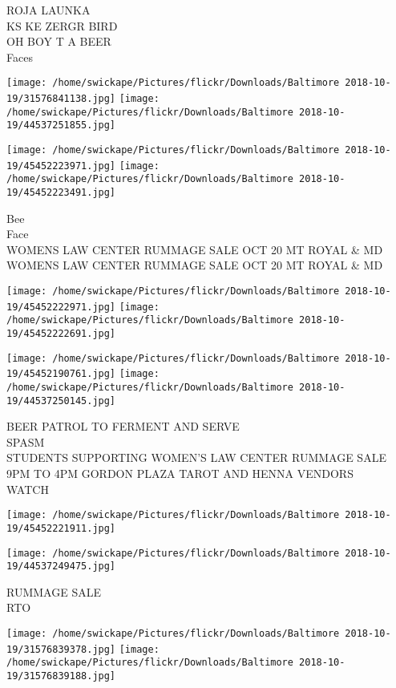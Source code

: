 \documentclass[10pt,letterpaper]{article}
\begin{document}
ROJA LAUNKA\\
KS KE ZERGR BIRD\\
OH BOY T A BEER\\
Faces
\pagebreak

\texttt{[image: /home/swickape/Pictures/flickr/Downloads/Baltimore 2018-10-19/31576841138.jpg]}
\texttt{[image: /home/swickape/Pictures/flickr/Downloads/Baltimore 2018-10-19/44537251855.jpg]}

\texttt{[image: /home/swickape/Pictures/flickr/Downloads/Baltimore 2018-10-19/45452223971.jpg]}
\texttt{[image: /home/swickape/Pictures/flickr/Downloads/Baltimore 2018-10-19/45452223491.jpg]}

Bee\\
Face\\
WOMENS LAW CENTER RUMMAGE SALE OCT 20 MT ROYAL \& MD\\
WOMENS LAW CENTER RUMMAGE SALE OCT 20 MT ROYAL \& MD
\pagebreak

\texttt{[image: /home/swickape/Pictures/flickr/Downloads/Baltimore 2018-10-19/45452222971.jpg]}
\texttt{[image: /home/swickape/Pictures/flickr/Downloads/Baltimore 2018-10-19/45452222691.jpg]}

\texttt{[image: /home/swickape/Pictures/flickr/Downloads/Baltimore 2018-10-19/45452190761.jpg]}
\texttt{[image: /home/swickape/Pictures/flickr/Downloads/Baltimore 2018-10-19/44537250145.jpg]}

BEER PATROL TO FERMENT AND SERVE\\
SPASM\\
STUDENTS SUPPORTING WOMEN'S LAW CENTER RUMMAGE SALE 9PM TO 4PM GORDON PLAZA TAROT AND HENNA VENDORS\\
WATCH
\pagebreak

\texttt{[image: /home/swickape/Pictures/flickr/Downloads/Baltimore 2018-10-19/45452221911.jpg]}

\vspace{0.25in}
\texttt{[image: /home/swickape/Pictures/flickr/Downloads/Baltimore 2018-10-19/44537249475.jpg]}

RUMMAGE SALE\\
RTO
\pagebreak

\texttt{[image: /home/swickape/Pictures/flickr/Downloads/Baltimore 2018-10-19/31576839378.jpg]}
\texttt{[image: /home/swickape/Pictures/flickr/Downloads/Baltimore 2018-10-19/31576839188.jpg]}
\end{document}
